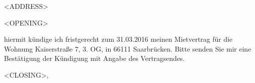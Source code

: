\documentclass[12pt, a4]{letter}
\date{\formatdate{28}{12}{2015}}
\begin{document}
\begin{letter}{<ADDRESS>}
    \opening{<OPENING>}

    hiermit kündige ich fristgerecht zum 31.03.2016 meinen Mietvertrag für die Wohnung Kaiserstraße
    7, 3. OG, in 66111 Saarbrücken. Bitte senden Sie mir eine Bestätigung der Kündigung mit Angabe
    des Vertragsendes.

    \closing{<CLOSING>,}
\end{letter}
\end{document}
